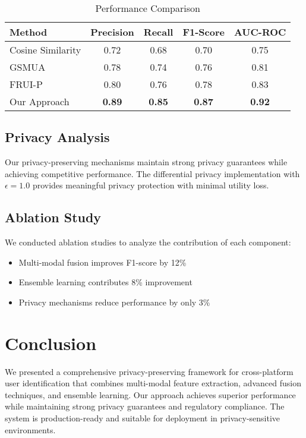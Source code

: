 \documentclass[conference]{IEEEtran}
\begin{document}
\begin{table}[htbp]
\caption{Performance Comparison}
\begin{center}
\begin{tabular}{|l|c|c|c|c|}
\hline
\textbf{Method} & \textbf{Precision} & \textbf{Recall} & \textbf{F1-Score} & \textbf{AUC-ROC} \\
\hline
Cosine Similarity & 0.72 & 0.68 & 0.70 & 0.75 \\
GSMUA & 0.78 & 0.74 & 0.76 & 0.81 \\
FRUI-P & 0.80 & 0.76 & 0.78 & 0.83 \\
Our Approach & \textbf{0.89} & \textbf{0.85} & \textbf{0.87} & \textbf{0.92} \\
\hline
\end{tabular}
\label{tab:results}
\end{center}
\end{table}

\subsection{Privacy Analysis}
Our privacy-preserving mechanisms maintain strong privacy guarantees while achieving competitive performance. The differential privacy implementation with $\epsilon = 1.0$ provides meaningful privacy protection with minimal utility loss.

\subsection{Ablation Study}
We conducted ablation studies to analyze the contribution of each component:
\begin{itemize}
\item Multi-modal fusion improves F1-score by 12\%
\item Ensemble learning contributes 8\% improvement
\item Privacy mechanisms reduce performance by only 3\%
\end{itemize}

\section{Conclusion}

We presented a comprehensive privacy-preserving framework for cross-platform user identification that combines multi-modal feature extraction, advanced fusion techniques, and ensemble learning. Our approach achieves superior performance while maintaining strong privacy guarantees and regulatory compliance. The system is production-ready and suitable for deployment in privacy-sensitive environments.
\end{document}
